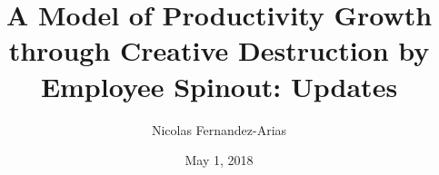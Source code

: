 \documentclass[english,usenames,dvipsnames]{beamer}
\title{A Model of Productivity Growth through Creative Destruction by Employee Spinout: Updates}
\author{Nicolas Fernandez-Arias}
\date[May 1, 2018]{May 1, 2018}
\begin{document}
	  
\frame{\titlepage}

\end{document}
